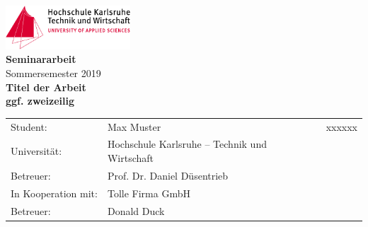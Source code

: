 \documentclass[12pt,digital]{hska}
\begin{document}

% 

\thispagestyle{plain}
\begin{titlepage}
\begin{center}
\includegraphics[width=0.35\textwidth]{images/hska_logo.pdf}\\[12ex]

\LARGE{\textbf{Seminararbeit}\\Sommersemester 2019}\\[8ex]

\textbf{Titel der Arbeit\\
ggf. zweizeilig}\\[12ex]

\normalsize{}
\begin{tabular}{lll}
Student:  & \quad Max Muster & xxxxxx\\[3ex]
Universität: & \quad Hochschule Karlsruhe – Technik und Wirtschaft &\\[1ex]
Betreuer:  & \quad Prof. Dr. Daniel Düsentrieb &\\[3ex]
In Kooperation mit: & \quad Tolle Firma GmbH &\\[1ex]
Betreuer:  & \quad Donald Duck &\\[1ex]
\end{tabular}

\end{center}
\end{titlepage}

\tableofcontents
\end{document}

